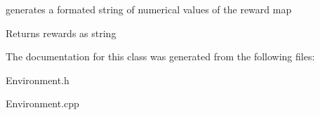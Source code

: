 generates a formated string of numerical values of the reward map \begin{DoxyReturn}{Returns}
rewards as string 
\end{DoxyReturn}


The documentation for this class was generated from the following files\+:\begin{DoxyCompactItemize}
\item 
Environment.\+h\item 
Environment.\+cpp\end{DoxyCompactItemize}

